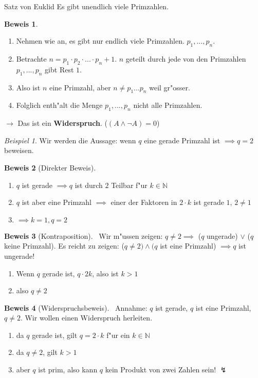 \documentclass[11pt]{article}
\theoremstyle{remark}
\newtheorem{exa}{Beispiel}[section]
\theoremstyle{definition}
\newtheorem{prof}{Beweis}
\theoremstyle{remark}
\begin{document}
\begin{theo}{Satz von Euklid}{}
Es gibt unendlich viele Primzahlen.
\end{theo}

\begin{prof}\
\begin{enumerate}
\item Nehmen wie an, es gibt nur endlich viele Primzahlen. \(p_1, ..., p_n\).
\item Betrachte \(n=p_1\cdot p_2\cdot ... \cdot p_n + 1\). \(n\) geteilt durch jede
von den Primzahlen \(p_1, ..., p_n\) gibt Rest \(1\).
\item Also ist \(n\) eine Primzahl, aber \(n\not=p_1 ... p_n\) weil gr"osser.
\item Folglich enth"alt die Menge \({p_1,...,p_n}\) nicht alle Primzahlen.
\end{enumerate}
\indent\indent \(\rightarrow\) Das ist ein \textbf{Widerspruch}. (\((A\wedge \neg A) = 0\))
\end{prof}


\begin{exa}
Wir werden die Aussage: wenn \(q\) eine gerade Primzahl ist \(\implies q=2\)
beweisen.

\begin{prof}[Direkter Beweis] \label{} \
\begin{enumerate}
\item \(q\) ist gerade \(\implies q\) ist durch \(2\) Teilbar f"ur \(k\in\mathbb{N}\)
\item \(q\) ist aber eine Primzahl \(\implies\) einer der Faktoren in \(2\cdot k\) ist
gerade \(1\), \(2\not= 1\)
\item \(\implies k=1, q=2\)
\end{enumerate}
\end{prof}

\begin{prof}[Kontraposition] \label{} \
Wir m"ussen zeigen: \(q\not= 2\implies\) (\(q\) ungerade) \(\vee\) (\(q\) keine
Primzahl). Es reicht zu zeigen: (\(q\not=2)\wedge(q\) ist eine Primzahl)
\(\implies q\) ist ungerade!
\begin{enumerate}
\item Wenn \(q\) gerade ist, \(q\cdot 2k\), also ist \(k>1\)
\item also \(q\not= 2\)
\end{enumerate}
\end{prof}

\begin{prof}[Widerspruchsbeweis] \label{} \
Annahme: \(q\) ist gerade, \(q\) ist eine Primzahl, \(q\not= 2\). Wir wollen einen
Widerspruch herleiten.

\begin{enumerate}
\item da \(q\) gerade ist, gilt \(q=2\cdot k\) f"ur ein \(k\in \mathbb{N}\)
\item da \(q\not= 2\), gilt \(k>1\)
\item aber \(q\) ist prim, also kann \(q\) kein Produkt von zwei Zahlen sein! \(\lightning\)
\end{enumerate}
\end{prof}
\end{exa}
\end{document}
